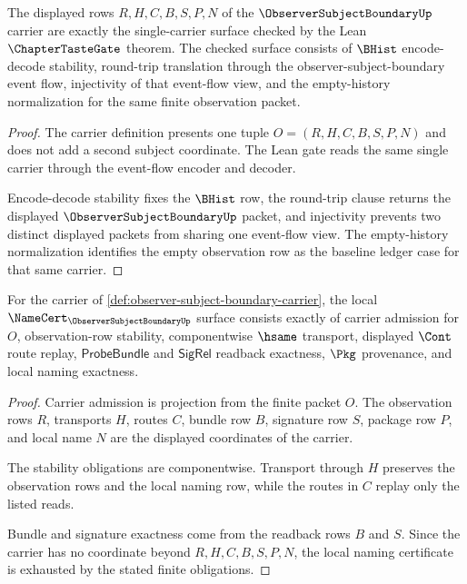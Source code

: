 \begin{theorem}
\label{thm:observer-subject-boundary-tastegate-alignment}
The displayed rows $R,H,C,B,S,P,N$ of the $\ObserverSubjectBoundaryUp$ carrier are exactly the single-carrier surface checked by the Lean $\ChapterTasteGate$ theorem. The checked surface consists of $\BHist$ encode-decode stability, round-trip translation through the observer-subject-boundary event flow, injectivity of that event-flow view, and the empty-history normalization for the same finite observation packet.
\end{theorem}
\begin{proof}
The carrier definition presents one tuple $O=(R,H,C,B,S,P,N)$ and does not add a second subject coordinate. The Lean gate reads the same single carrier through the event-flow encoder and decoder.

Encode-decode stability fixes the $\BHist$ row, the round-trip clause returns the displayed $\ObserverSubjectBoundaryUp$ packet, and injectivity prevents two distinct displayed packets from sharing one event-flow view. The empty-history normalization identifies the empty observation row as the baseline ledger case for that same carrier.
\end{proof}

\begin{theorem}
\label{thm:observer-subject-boundary-namecert-obligations}
For the carrier of \autoref{def:observer-subject-boundary-carrier}, the local $\NameCert_{\ObserverSubjectBoundaryUp}$ surface consists exactly of carrier admission for $O$, observation-row stability, componentwise $\hsame$ transport, displayed $\Cont$ route replay, $\mathsf{ProbeBundle}$ and $\mathsf{SigRel}$ readback exactness, $\Pkg$ provenance, and local naming exactness.
\end{theorem}
\begin{proof}
Carrier admission is projection from the finite packet $O$. The observation rows $R$, transports $H$, routes $C$, bundle row $B$, signature row $S$, package row $P$, and local name $N$ are the displayed coordinates of the carrier.

The stability obligations are componentwise. Transport through $H$ preserves the observation rows and the local naming row, while the routes in $C$ replay only the listed reads.

Bundle and signature exactness come from the readback rows $B$ and $S$. Since the carrier has no coordinate beyond $R,H,C,B,S,P,N$, the local naming certificate is exhausted by the stated finite obligations.
\end{proof}

